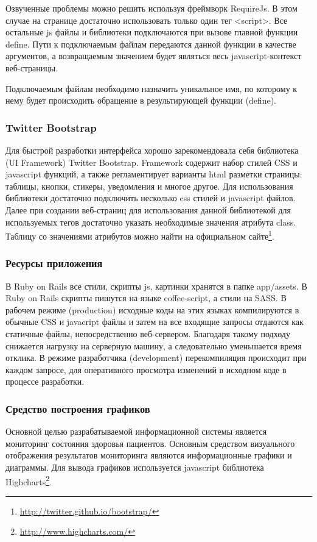 Озвученные проблемы можно решить используя фреймворк RequireJs. В этом случае на
странице достаточно использовать только один тег <script>. Все остальные js
файлы и библиотеки подключаются при вызове главной функции define. Пути к
подключаемым файлам передаются данной функции в качестве аргументов, а
возвращаемым значением будет являться весь javascript-контекст веб-страницы.

Подключаемым файлам необходимо назначить уникальное имя, по которому к нему
будет происходить обращение в результирующей функции (define).

\subsubsection{Twitter Bootstrap}
Для быстрой разработки интерфейса хорошо зарекомендовала себя библиотека (UI
Framework) Twitter Bootstrap. Framework содержит набор стилей CSS и javascript
функций, а также регламентирует варианты html разметки страницы: таблицы,
кнопки, стикеры, уведомления и многое другое. Для использования библиотеки
достаточно подключить несколько css стилей и javascript файлов. Далее при
создании веб-страниц для использования данной библиотекой для используемых тегов
достаточно указать необходимые значения атрибута class. Таблицу со значениями
атрибутов можно найти на официальном сайте\footnote{
	\url{http://twitter.github.io/bootstrap/}
}.

\subsubsection{Ресурсы приложения}
В Ruby on Rails все стили, скрипты js, картинки хранятся в папке app/assets. В
Ruby on Rails скрипты пишутся на языке coffee-script, а стили на SASS. В рабочем
режиме (production) исходные коды на этих языках компилируются в обычные CSS и
javacript файлы и затем на все входящие запросы отдаются как статичные файлы,
непосредственно веб-сервером. Благодаря такому подходу снижается нагрузку на
серверную машину, а следовательно уменьшается время отклика. В режиме
разработчика (development) перекомпиляция происходит при каждом запросе, для
оперативного просмотра изменений в исходном коде в процессе разработки.

\subsubsection{Средство построения графиков}
Основной целью разрабатываемой информационной системы является мониторинг
состояния здоровья пациентов. Основным средством визуального отображения
результатов мониторинга являются информационные графики и диаграммы. Для вывода
графиков используется javascript библиотека Highcharts\footnote{
	\url{http://www.highcharts.com/}
}.

